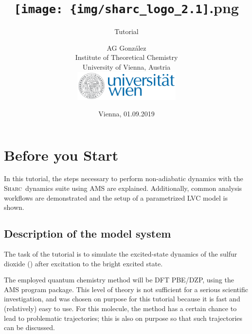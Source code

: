 \documentclass[a4paper,11pt,DIV=15,openany]{scrbook}
\title{\hspace{1cm}\texttt{[image: \{img/sharc\_logo\_2.1]}.png}\\[0.5cm]
\subtitle{Tutorial\\[1cm]}
\date{Vienna, 01.09.2019}
\author{AG Gonz\'alez\\
Institute of Theoretical Chemistry\\
University of Vienna, Austria
\vspace{1cm}
\\
\includegraphics[width=0.4\textwidth,keepaspectratio=true]{img/univie.pdf}}
\newcommand{\sharc}{\textsc{Sharc}}
\begin{document}
\tpage


\newpage
{}
\ohead{\leftmark\quad {\normalfont|} \quad\rightmark}
\ofoot[\pagemark]{\pagemark}


\tableofcontents


\chapter{Before you Start}

In this tutorial, the steps necessary to perform non-adiabatic dynamics with the \sharc\ dynamics suite using AMS are explained. Additionally, common analysis workflows are demonstrated and the setup of a parametrized LVC model is shown. 


\section{Description of the model system}
\label{sec:model_system}

The task of the tutorial is to simulate the excited-state dynamics of the sulfur dioxide () after excitation to the bright excited state.

The employed quantum chemistry method will be DFT PBE/DZP, using the \textsc{AMS} program package. 
This level of theory is not sufficient for a serious scientific investigation, and was chosen on purpose for this tutorial because it is fast and (relatively) easy to use.
For this molecule, the method has a certain chance to lead to problematic trajectories; this is also on purpose so that such trajectories can be discussed.
\end{document}
